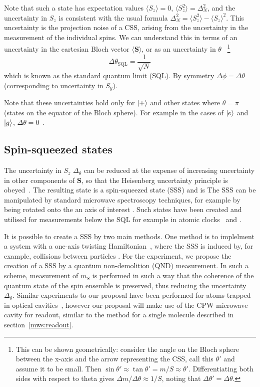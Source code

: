 %
Note that such a state has expectation values $\langle S_z \rangle = 0$,
$\langle S_z^2\rangle = \Delta_N^2$, and the uncertainty in $S_z$ is consistent
with the usual formula $\Delta_N^2 = \langle S_z^2 \rangle - \langle
S_z\rangle^2$. This uncertainty is the projection noise of a CSS, arising from
the uncertainty in the measurement of the individual spins. We can understand
this in terms of an uncertainty in the cartesian Bloch vector $\langle
\mathbf{S} \rangle$, or as an uncertainty in $\theta$~\cite{PhysRevA.47.3554}
%
\footnote{This can be shown geometrically: consider the angle on the Bloch
sphere between the x-axis and the arrow representing the CSS, call this
$\theta'$ and assume it to be small. Then $\sin
\theta' \approx \tan \theta' = m/S \approx \theta'$. Differentiating both sides
with respect to theta gives $\Delta m / \Delta \theta \approx 1/S$, noting that
$\Delta \theta' = \Delta \theta$.
}
%
\begin{equation}
  \Delta\theta_\text{SQL} = \frac{1}{\sqrt{N}}
\end{equation}
which is known as the standard quantum limit (SQL). By symmetry $\Delta \phi =
\Delta \theta$ (corresponding to uncertainty in $S_y$).
%

Note that these uncertainties hold only for $\ket{+}$ and other states where
$\theta = \pi$ (states on the equator of the Bloch sphere). For example in the
cases of $\ket{e}$ and $\ket{g}$, $\Delta \theta = 0$~\cite{PhysRevA.47.3554}.

\subsection{Spin-squeezed states}

The uncertainty in $S_z$ $\Delta_\theta$ can be reduced at the expense of
increasing uncertainty in other components of $\mathbf{S}$, so that the
Heisenberg uncertainty principle is obeyed~\cite{}. The resulting state is a
spin-squeezed state (SSS) and is  The SSS can be
manipulated by standard microwave spectroscopy techniques, for example by being
rotated onto the an axis of interest . Such states have
been created and utilised for measurements below the SQL for example in atomic
clocks~\cite{} and .

It is possible to create a SSS by two main methods. One method is to implelment
a system with a one-axis twisting Hamiltonian~\cite{}, where the SSS is induced
by, for example, collisions between particles . For the
\CaF{} experiment, we propose the creation of a SSS by a quantum non-demolition
(QND) measurement. In such a scheme, measurement of
$m_S$ is performed in such a way that the coherence of the quantum state of the
spin ensemble is preserved, thus reducing the uncertainty $\Delta_\theta$.
Similar experiments to our proposal have been performed for atoms trapped in
optical cavities~\cite{Cox2016, SchleierSmith2011}, however our proposal will 
make use of the CPW microwave cavity for readout, similar to the method for a
single molecule described in section~\ref{mws:readout}.

